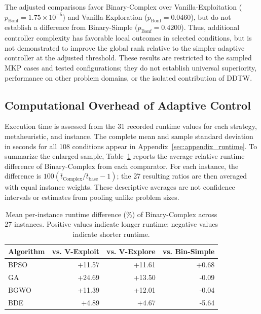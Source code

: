 \documentclass[journal,article,submit,moreauthors]{Definitions/mdpi}
\begin{document}
The adjusted comparisons favor Binary-Complex over
Vanilla-Exploitation ($p_{\mathrm{Bonf}}=1.75\times10^{-5}$) and
Vanilla-Exploration ($p_{\mathrm{Bonf}}=0.0460$), but do not establish a
difference from Binary-Simple ($p_{\mathrm{Bonf}}=0.4200$).
Thus, additional controller complexity has favorable local outcomes in
selected conditions, but is not demonstrated to improve the global rank
relative to the simpler adaptive controller at the adjusted threshold.
These results are restricted to the sampled MKP cases and tested
configurations; they do not establish universal superiority, performance
on other problem domains, or the isolated contribution of DDTW.

\subsection{Computational Overhead of Adaptive Control}
\label{subsec:computational_time}

Execution time is assessed from the 31 recorded runtime values for each
strategy, metaheuristic, and instance. The complete mean and sample standard
deviation in seconds for all 108 conditions appear in
Appendix~\ref{sec:appendix_runtime}. To summarize the enlarged sample,
Table~\ref{tab:computational_cost} reports the average relative runtime
difference of Binary-Complex from each comparator. For each instance, the
difference is $100(\bar{t}_{\mathrm{Complex}}/\bar{t}_{\mathrm{base}}-1)$;
the 27 resulting ratios are then averaged with equal instance weights.
These descriptive averages are not confidence intervals or estimates from
pooling unlike problem sizes.

\begin{table}[htbp]
  \centering
  \small
  \caption{Mean per-instance runtime difference (\%) of Binary-Complex
  across 27 instances. Positive values indicate longer runtime;
  negative values indicate shorter runtime.}
  \label{tab:computational_cost}
  \begin{tabular}{lrrr}
    \toprule
    Algorithm & vs. V-Exploit & vs. V-Explore & vs. Bin-Simple \\
    \midrule
    BPSO & +11.57 & +11.61 & +0.68 \\
    GA & +24.69 & +13.50 & -0.09 \\
    BGWO & +11.39 & +12.01 & -0.04 \\
    BDE & +4.89 & +4.67 & -5.64 \\
    \bottomrule
  \end{tabular}
\end{table}
\end{document}
